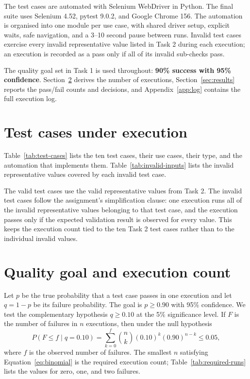 \documentclass[11pt,a4paper]{article}
\begin{document}
The test cases are automated with Selenium WebDriver in Python. The final
suite uses Selenium 4.52, pytest 9.0.2, and Google Chrome 156. The
automation is organised into one module per use case, with shared driver
setup, explicit waits, safe navigation, and a 3--10 second pause between
runs. Invalid test cases exercise every invalid representative value listed
in Task 2 during each execution; an execution is recorded as a pass only if
all of its invalid sub-checks pass.

The quality goal set in Task 1 is used throughout: \textbf{90\% success with
95\% confidence}. Section~\ref{sec:method} derives the number of executions,
Section~\ref{sec:results} reports the pass/fail counts and decisions, and
Appendix~\ref{app:log} contains the full execution log.

\section{Test cases under execution}
\label{sec:testcases}

Table~\ref{tab:test-cases} lists the ten test cases, their use cases, their
type, and the automation that implements them. Table~\ref{tab:invalid-inputs}
lists the invalid representative values covered by each invalid test case.





The valid test cases use the valid representative values from Task 2. The
invalid test cases follow the assignment's simplification clause: one
execution runs all of the invalid representative values belonging to that
test case, and the execution passes only if the expected validation result
is observed for every value. This keeps the execution count tied to the ten
Task 2 test cases rather than to the individual invalid values.

\section{Quality goal and execution count}
\label{sec:method}

Let $p$ be the true probability that a test case passes in one execution and
let $q = 1 - p$ be its failure probability. The goal is $p \ge 0.90$ with
95\% confidence. We test the complementary hypothesis $q \ge 0.10$ at the
5\% significance level. If $F$ is the number of failures in $n$ executions,
then under the null hypothesis
\begin{equation}
  P(F \le f \mid q = 0.10)
  = \sum_{k=0}^{f} \binom{n}{k} (0.10)^k (0.90)^{n-k}
  \le 0.05,
  \label{eq:binomial}
\end{equation}
where $f$ is the observed number of failures. The smallest $n$ satisfying
Equation~\eqref{eq:binomial} is the required execution count;
Table~\ref{tab:required-runs} lists the values for zero, one, and two
failures.
\end{document}
